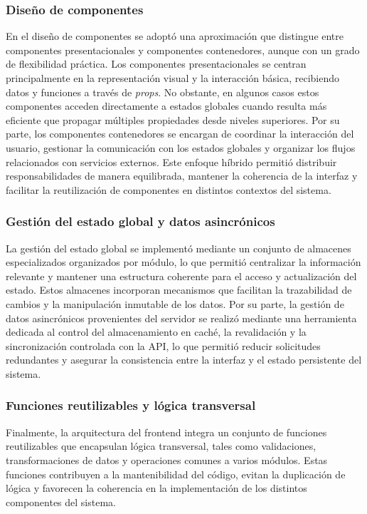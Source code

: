 \subsubsection{Diseño de componentes}
En el diseño de componentes se adoptó una aproximación que distingue entre componentes presentacionales y componentes contenedores, aunque con un grado de flexibilidad práctica. Los componentes presentacionales se centran principalmente en la representación visual y la interacción básica, recibiendo datos y funciones a través de \textit{props}. No obstante, en algunos casos estos componentes acceden directamente a estados globales cuando resulta más eficiente que propagar múltiples propiedades desde niveles superiores. Por su parte, los componentes contenedores se encargan de coordinar la interacción del usuario, gestionar la comunicación con los estados globales y organizar los flujos relacionados con servicios externos. Este enfoque híbrido permitió distribuir responsabilidades de manera equilibrada, mantener la coherencia de la interfaz y facilitar la reutilización de componentes en distintos contextos del sistema.

\subsubsection{Gestión del estado global y datos asincrónicos}
La gestión del estado global se implementó mediante un conjunto de almacenes especializados organizados por módulo, lo que permitió centralizar la información relevante y mantener una estructura coherente para el acceso y actualización del estado. Estos almacenes incorporan mecanismos que facilitan la trazabilidad de cambios y la manipulación inmutable de los datos. Por su parte, la gestión de datos asincrónicos provenientes del servidor se realizó mediante una herramienta dedicada al control del almacenamiento en caché, la revalidación y la sincronización controlada con la API, lo que permitió reducir solicitudes redundantes y asegurar la consistencia entre la interfaz y el estado persistente del sistema.

\subsubsection{Funciones reutilizables y lógica transversal}
Finalmente, la arquitectura del frontend integra un conjunto de funciones reutilizables que encapsulan lógica transversal, tales como validaciones, transformaciones de datos y operaciones comunes a varios módulos. Estas funciones contribuyen a la mantenibilidad del código, evitan la duplicación de lógica y favorecen la coherencia en la implementación de los distintos componentes del sistema.

